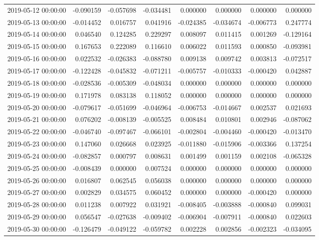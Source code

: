 \begin{tabular}{lrrrrrrr}
2019-05-12 00:00:00 & -0.090159 & -0.057698 & -0.034481 & 0.000000 & 0.000000 & 0.000000 & 0.000000 \\
2019-05-13 00:00:00 & -0.014452 & 0.016757 & 0.041916 & -0.024385 & -0.034674 & -0.006773 & 0.247774 \\
2019-05-14 00:00:00 & 0.046540 & 0.124285 & 0.229297 & 0.008097 & 0.011415 & 0.001269 & -0.129164 \\
2019-05-15 00:00:00 & 0.167653 & 0.222089 & 0.116610 & 0.006022 & 0.011593 & 0.000850 & -0.093981 \\
2019-05-16 00:00:00 & 0.022532 & -0.026383 & -0.088780 & 0.009138 & 0.009742 & 0.003813 & -0.072517 \\
2019-05-17 00:00:00 & -0.122428 & -0.045832 & -0.071211 & -0.005757 & -0.010333 & -0.000420 & 0.042887 \\
2019-05-18 00:00:00 & -0.028536 & -0.005309 & -0.048034 & 0.000000 & 0.000000 & 0.000000 & 0.000000 \\
2019-05-19 00:00:00 & 0.171978 & 0.083138 & 0.118052 & 0.000000 & 0.000000 & 0.000000 & 0.000000 \\
2019-05-20 00:00:00 & -0.079617 & -0.051699 & -0.046964 & -0.006753 & -0.014667 & 0.002537 & 0.021693 \\
2019-05-21 00:00:00 & 0.076202 & -0.008139 & -0.005525 & 0.008484 & 0.010801 & 0.002946 & -0.087062 \\
2019-05-22 00:00:00 & -0.046740 & -0.097467 & -0.066101 & -0.002804 & -0.004460 & -0.000420 & -0.013470 \\
2019-05-23 00:00:00 & 0.147060 & 0.026668 & 0.023925 & -0.011880 & -0.015906 & -0.003366 & 0.137254 \\
2019-05-24 00:00:00 & -0.082857 & 0.000797 & 0.008631 & 0.001499 & 0.001159 & 0.002108 & -0.065328 \\
2019-05-25 00:00:00 & -0.008439 & 0.000000 & 0.007524 & 0.000000 & 0.000000 & 0.000000 & 0.000000 \\
2019-05-26 00:00:00 & 0.016807 & 0.062545 & 0.056038 & 0.000000 & 0.000000 & 0.000000 & 0.000000 \\
2019-05-27 00:00:00 & 0.002829 & 0.034575 & 0.060452 & 0.000000 & 0.000000 & -0.000420 & 0.000000 \\
2019-05-28 00:00:00 & 0.011238 & 0.007922 & 0.031921 & -0.008405 & -0.003888 & -0.000840 & 0.099031 \\
2019-05-29 00:00:00 & 0.056547 & -0.027638 & -0.009402 & -0.006904 & -0.007911 & -0.000840 & 0.022603 \\
2019-05-30 00:00:00 & -0.126479 & -0.049122 & -0.059782 & 0.002228 & 0.002856 & -0.002323 & -0.034095 \\

\end{tabular}
